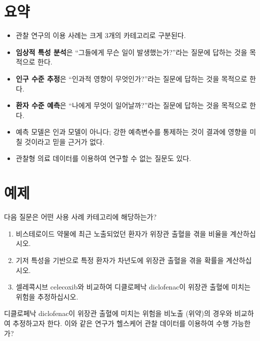 \documentclass[10.5pt]{book}
\theoremstyle{definition}
\theoremstyle{definition}
\theoremstyle{definition}
\theoremstyle{remark}
\let\BeginKnitrBlock\begin \let\EndKnitrBlock\end
\begin{document}
\section{요약}\label{-5}

\BeginKnitrBlock{rmdsummary}
\begin{itemize}
\item
  관찰 연구의 이용 사례는 크게 3개의 카테고리로 구분된다.
\item
  \textbf{임상적 특성 분석}은 ``그들에게 무슨 일이 발생했는가?''라는
  질문에 답하는 것을 목적으로 한다.
\item
  \textbf{인구 수준 추정}은 ``인과적 영향이 무엇인가?''라는 질문에
  답하는 것을 목적으로 한다.
\item
  \textbf{환자 수준 예측}은 ``나에게 무엇이 일어날까?''라는 질문에
  답하는 것을 목적으로 한다.
\item
  예측 모델은 인과 모델이 아니다; 강한 예측변수를 통제하는 것이 결과에
  영향을 미칠 것이라고 믿을 근거가 없다.
\item
  관찰형 의료 데이터를 이용하여 연구할 수 없는 질문도 있다.
\end{itemize}
\EndKnitrBlock{rmdsummary}

\section{예제}\label{-3}

\BeginKnitrBlock{exercise}
\protect\hypertarget{exr:exerciseUseCases1}{}{\label{exr:exerciseUseCases1}
}다음 질문은 어떤 사용 사례 카테고리에 해당하는가?

\begin{enumerate}
\def\labelenumi{\arabic{enumi}.}
\item
  비스테로이드 약물에 최근 노출되었던 환자가 위장관 출혈을 겪을 비율을
  계산하십시오.
\item
  기저 특성을 기반으로 특정 환자가 차년도에 위장관 출혈을 겪을 확률을
  계산하십시오.
\item
  셀레콕시브 celecoxib와 비교하여 디클로페낙 diclofenac이 위장관 출혈에
  미치는 위험을 추정하십시오.
\end{enumerate}
\EndKnitrBlock{exercise}

\BeginKnitrBlock{exercise}
\protect\hypertarget{exr:exerciseUseCases2}{}{\label{exr:exerciseUseCases2}
}디클로페낙 diclofenac이 위장관 출혈에 미치는 위험을 비노출 (위약)의
경우와 비교하여 추정하고자 한다. 이와 같은 연구가 헬스케어 관찰 데이터를
이용하여 수행 가능한가?
\EndKnitrBlock{exercise}
\end{document}
